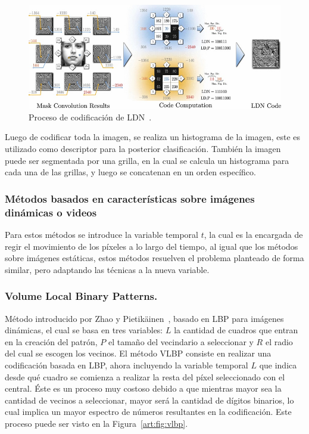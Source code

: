 \begin{figure}[tb]
  \centering
   \includegraphics[width=1\textwidth]{Figuras/ldn.jpg}
  \caption{Proceso de codificación de LDN~\cite{RamirezRivera2013}.}
  \label{art:fig:ldn}
\end{figure}

		Luego de codificar toda la imagen, se realiza un histograma de la imagen, este es utilizado como descriptor para la posterior clasificación. También la imagen puede ser segmentada por una grilla, en la cual se calcula un histograma para cada una de las grillas, y luego se concatenan en un orden específico.

	\subsubsection{Métodos basados en características sobre imágenes dinámicas o videos}	
	\label{sec:met_videos}
	Para estos métodos se introduce la variable temporal $t$, la cual es la encargada de regir el movimiento de los píxeles a lo largo del tiempo, al igual que los métodos sobre imágenes estáticas, estos métodos resuelven el problema planteado de forma similar, pero adaptando las técnicas a la nueva variable.

		\subsubsection{Volume Local Binary Patterns.}
		\label{sec:vlbp}
		Método introducido por Zhao y Pietikäinen~\cite{Zhao2006,Zhao2007a,Zhao2007}, basado en LBP para imágenes dinámicas, el cual se basa en tres variables: $L$ la cantidad de cuadros que entran en la creación del patrón, $P$ el tamaño del vecindario a seleccionar y $R$ el radio del cual se escogen los vecinos. 
El método VLBP consiste en realizar una codificación basada en LBP, ahora incluyendo la variable temporal $L$ que indica desde qué cuadro se comienza a realizar la resta del píxel seleccionado con el central.
Éste es un proceso muy costoso debido a que mientras mayor sea la cantidad de vecinos a seleccionar, mayor será la cantidad de dígitos binarios, lo cual implica un mayor espectro de números resultantes en la codificación. Este proceso puede ser visto en la Figura~\ref{art:fig:vlbp}.

